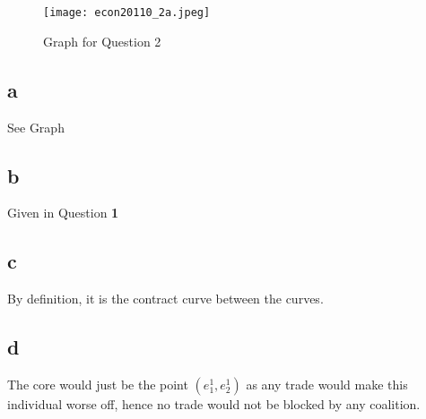 \documentclass[11pt]{article}
\begin{document}
\section{}
\begin{figure}[H]
    \centering
    \texttt{[image: econ20110\_2a.jpeg]}
    \caption{Graph for Question 2}
    \label{fig:1l}
\end{figure}
\subsection*{a}
See Graph 
\subsection*{b}
Given in Question \textbf{1}
\subsection*{c}
By definition, it is the contract curve between the curves. 
\subsection*{d}
The core would just be the point $(e_1^1, e_2^1)$ as any trade would make this individual worse off, hence no trade would not be blocked by any coalition. 
\end{document}
